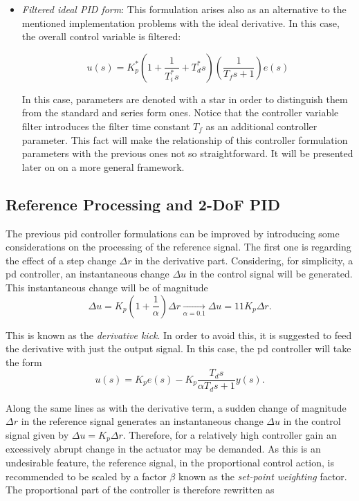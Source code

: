 \begin{itemize}
\item \emph{Filtered ideal PID form}: This formulation arises also as an alternative to the mentioned implementation problems with the ideal derivative. In this case, the overall control variable is filtered:

\begin{equation}
	u(s) =  K^*_p \left(1+ \frac{1}{T^*_i s} + T^*_d s  \right) \left(\frac{1}{T_f s+1}\right) e(s)	
\end{equation} 

In this case, parameters are denoted with a star in order to distinguish them from the standard and series form ones. Notice that the controller variable filter introduces the filter time constant $T_f$ as an additional controller parameter. This fact will make the relationship of this controller formulation parameters with the previous ones not so straightforward. It will be presented later on on a more general framework. 
\end{itemize}
%
\subsection{Reference Processing and 2-DoF PID}
\label{sec:3.2}
The previous \gls{pid} controller formulations can be improved by introducing some considerations on the processing of the reference signal. The first one is regarding the effect of a step change $\Delta r$ in the derivative part. Considering, for simplicity, a \gls{pd} controller, an instantaneous change $\Delta u$ in the control signal will be generated. This instantaneous change will be of magnitude
%
\begin{equation}
\Delta u = K_p \left ( 1 +\frac{1}{\alpha} \right ) \Delta r \xrightarrow[\alpha=0.1]{}\Delta u = 11 K_p \Delta r.
\end{equation} 

This is known as the \emph{derivative kick}. In order to avoid this, it is suggested to feed the derivative with just the output signal.  In this case, the \gls{pd} controller will take the form
%
\begin{equation}
u(s)=K_p e(s) - K_p\frac{T_ds}{\alpha T_d s+1} y(s).
\end{equation}

Along the same lines as with the derivative term, a sudden change of magnitude $\Delta r$ in the reference signal generates an instantaneous change $\Delta u$ in the control signal given by $\Delta u = K_p \Delta r$. Therefore, for a relatively high controller gain an excessively abrupt change in the actuator may be demanded. As this is an undesirable feature, the reference signal, in the proportional control action, is recommended to be scaled by a factor $\beta$ known as the \emph{set-point weighting} factor.  The proportional part of the controller is therefore rewritten as

